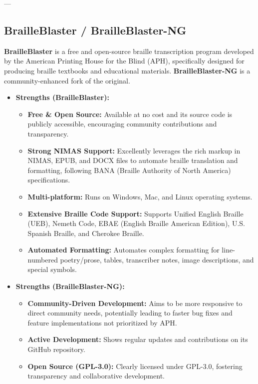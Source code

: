 ---

\subsection{BrailleBlaster / BrailleBlaster-NG}
\textbf{BrailleBlaster} is a free and open-source braille transcription program developed by the American Printing House for the Blind (APH), specifically designed for producing braille textbooks and educational materials. \textbf{BrailleBlaster-NG} is a community-enhanced fork of the original.

\begin{itemize}
    \item \textbf{Strengths (BrailleBlaster):}
    \begin{itemize}
        \item \textbf{Free & Open Source:} Available at no cost and its source code is publicly accessible, encouraging community contributions and transparency.
        \item \textbf{Strong NIMAS Support:} Excellently leverages the rich markup in NIMAS, EPUB, and DOCX files to automate braille translation and formatting, following BANA (Braille Authority of North America) specifications\footnotemark{}.
        \item \textbf{Multi-platform:} Runs on Windows, Mac, and Linux operating systems.
        \item \textbf{Extensive Braille Code Support:} Supports Unified English Braille (UEB), Nemeth Code, EBAE (English Braille American Edition), U.S. Spanish Braille, and Cherokee Braille.
        \item \textbf{Automated Formatting:} Automates complex formatting for line-numbered poetry/prose, tables, transcriber notes, image descriptions, and special symbols.
    \end{itemize}
    \item \textbf{Strengths (BrailleBlaster-NG):}
    \begin{itemize}
        \item \textbf{Community-Driven Development:} Aims to be more responsive to direct community needs, potentially leading to faster bug fixes and feature implementations not prioritized by APH\footnotemark{}.
        \item \textbf{Active Development:} Shows regular updates and contributions on its GitHub repository.
        \item \textbf{Open Source (GPL-3.0):} Clearly licensed under GPL-3.0, fostering transparency and collaborative development.

\end{itemize}
\end{itemize}
